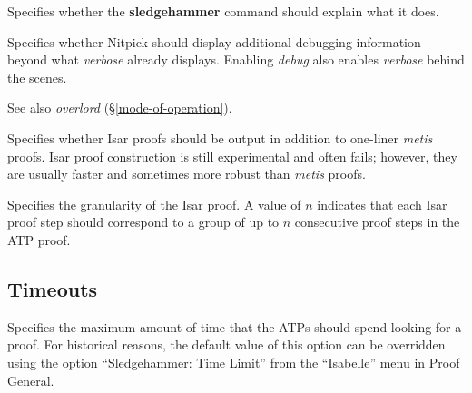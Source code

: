 \documentclass[a4paper,12pt]{article}
\begin{document}
\begin{enum}

Specifies whether the \textbf{sledgehammer} command should explain what it does.

Specifies whether Nitpick should display additional debugging information beyond
what \textit{verbose} already displays. Enabling \textit{debug} also enables
\textit{verbose} behind the scenes.

\nopagebreak
{\small See also \textit{overlord} (\S\ref{mode-of-operation}).}

Specifies whether Isar proofs should be output in addition to one-liner
\textit{metis} proofs. Isar proof construction is still experimental and often
fails; however, they are usually faster and sometimes more robust than
\textit{metis} proofs.

Specifies the granularity of the Isar proof. A value of $n$ indicates that each
Isar proof step should correspond to a group of up to $n$ consecutive proof
steps in the ATP proof.

\end{enum}

\subsection{Timeouts}
\label{timeouts}

\begin{enum}
Specifies the maximum amount of time that the ATPs should spend looking for a
proof. For historical reasons, the default value of this option can be
overridden using the option ``Sledgehammer: Time Limit'' from the ``Isabelle''
menu in Proof General.
\end{enum}

\let\em=\sl
{}

\end{document}
